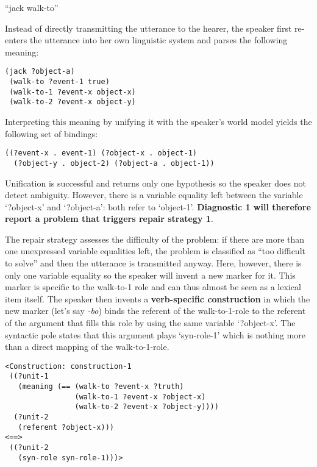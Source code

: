 \ea
``jack walk-to''
\z

Instead of directly transmitting the utterance to the hearer, the speaker first re-enters the utterance into her own linguistic system and parses the following meaning:

\ea
\begin{lstlisting}
(jack ?object-a)
 (walk-to ?event-1 true)
 (walk-to-1 ?event-x object-x)
 (walk-to-2 ?event-x object-y)
\end{lstlisting}
\z

Interpreting this meaning by unifying it with the speaker's world model yields the following set of bindings:

\ea
\begin{lstlisting}
((?event-x . event-1) (?object-x . object-1)
  (?object-y . object-2) (?object-a . object-1))
\end{lstlisting}
\z

Unification is successful and returns only one hypothesis so the speaker does not detect ambiguity. However, there is a variable equality left between the variable `?object-x' and `?object-a': both refer to `object-1'. {\bfseries Diagnostic 1 will therefore report a problem that triggers repair strategy 1}.

The repair strategy assesses the difficulty of the problem: if there are more than one unexpressed variable equalities left, the problem is classified as ``too difficult to solve'' and then the utterance is transmitted anyway. Here, however, there is only one variable equality so the speaker will invent a new marker for it. This marker is specific to the walk-to-1 role and can thus almost be seen as a lexical item itself. The speaker then invents a {\bfseries verb-specific construction} in which the new marker (let's say {\em -bo}) binds the referent of the walk-to-1-role to the referent of the argument that fills this role by using the same variable `?object-x'. The syntactic pole states that this argument plays `syn-role-1' which is nothing more than a direct mapping of the walk-to-1-role.


\ea
\begin{lstlisting}
<Construction: construction-1
 ((?unit-1
   (meaning (== (walk-to ?event-x ?truth)
                (walk-to-1 ?event-x ?object-x)
                (walk-to-2 ?event-x ?object-y))))
  (?unit-2
   (referent ?object-x)))
<==>
 ((?unit-2
   (syn-role syn-role-1)))>
\end{lstlisting}
\z


